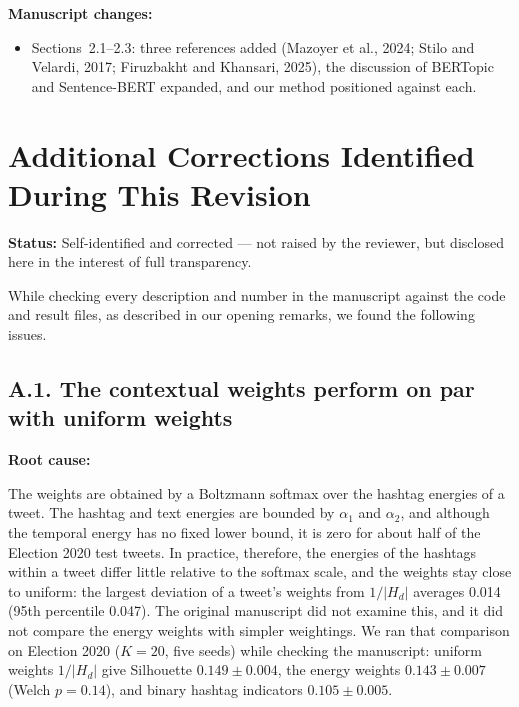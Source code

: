 \documentclass[11pt,a4paper]{article}
\newcommand{\status}[1]{\textbf{\color{statusgreen}Status:} #1}
\newcommand{\parthead}[1]{\par\medskip\textbf{#1}\par}
\begin{document}
\parthead{Manuscript changes:}
\begin{itemize}
\item Sections~2.1--2.3: three references added (Mazoyer et al., 2024; Stilo and Velardi, 2017; Firuzbakht and Khansari, 2025), the discussion of BERTopic and Sentence-BERT expanded, and our method positioned against each.
\end{itemize}

\section{Additional Corrections Identified During This Revision}

\status{Self-identified and corrected --- not raised by the reviewer, but disclosed here in the interest of full transparency.}

While checking every description and number in the manuscript against the code and result files, as described in our opening remarks, we found the following issues.

\subsection{A.1. The contextual weights perform on par with uniform weights}

\parthead{Root cause:}
The weights are obtained by a Boltzmann softmax over the hashtag energies of a tweet. The hashtag and text energies are bounded by $\alpha_1$ and $\alpha_2$, and although the temporal energy has no fixed lower bound, it is zero for about half of the Election 2020 test tweets. In practice, therefore, the energies of the hashtags within a tweet differ little relative to the softmax scale, and the weights stay close to uniform: the largest deviation of a tweet's weights from $1/|H_d|$ averages 0.014 (95th percentile 0.047). The original manuscript did not examine this, and it did not compare the energy weights with simpler weightings. We ran that comparison on Election 2020 ($K = 20$, five seeds) while checking the manuscript: uniform weights $1/|H_d|$ give Silhouette $0.149 \pm 0.004$, the energy weights $0.143 \pm 0.007$ (Welch $p = 0.14$), and binary hashtag indicators $0.105 \pm 0.005$.
\end{document}
